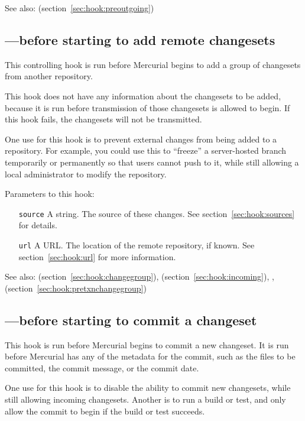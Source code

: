 See also:  (section~\ref{sec:hook:preoutgoing})

\subsection{---before starting to add remote changesets}
\label{sec:hook:prechangegroup}

This controlling hook is run before Mercurial begins to add a group of
changesets from another repository.

This hook does not have any information about the changesets to be
added, because it is run before transmission of those changesets is
allowed to begin.  If this hook fails, the changesets will not be
transmitted.

One use for this hook is to prevent external changes from being added
to a repository.  For example, you could use this to ``freeze'' a
server-hosted branch temporarily or permanently so that users cannot
push to it, while still allowing a local administrator to modify the
repository.

Parameters to this hook:
\begin{itemize}
\item[\texttt{source}] A string.  The source of these changes.  See
  section~\ref{sec:hook:sources} for details.
\item[\texttt{url}] A URL.  The location of the remote repository, if
  known.  See section~\ref{sec:hook:url} for more information.
\end{itemize}

See also:  (section~\ref{sec:hook:changegroup}),
 (section~\ref{sec:hook:incoming}), ,
 (section~\ref{sec:hook:pretxnchangegroup})

\subsection{---before starting to commit a changeset}
\label{sec:hook:precommit}

This hook is run before Mercurial begins to commit a new changeset.
It is run before Mercurial has any of the metadata for the commit,
such as the files to be committed, the commit message, or the commit
date.

One use for this hook is to disable the ability to commit new
changesets, while still allowing incoming changesets.  Another is to
run a build or test, and only allow the commit to begin if the build
or test succeeds.

